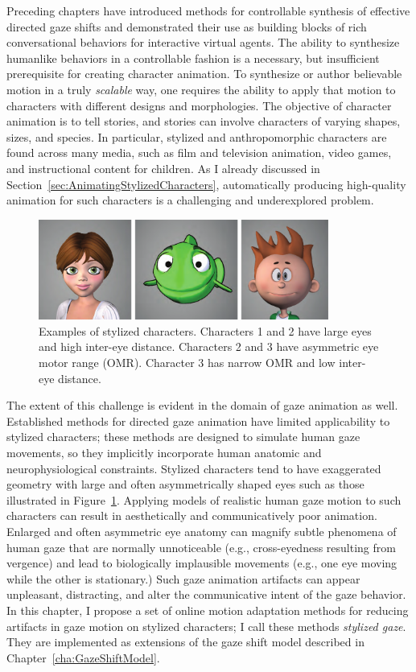Preceding chapters have introduced methods for controllable synthesis of effective directed gaze shifts and demonstrated their use as building blocks of rich conversational behaviors for interactive virtual agents. The ability to synthesize humanlike behaviors in a controllable fashion is a necessary, but insufficient prerequisite for creating character animation.
To synthesize or author believable motion in a truly \emph{scalable} way, one requires the ability to apply that motion to characters with different designs and morphologies. The objective of character animation is to tell stories, and stories can involve characters of varying shapes, sizes, and species. In particular, stylized and anthropomorphic characters are found across many media, such as film and television animation, video games, and instructional content for children. As I already discussed in Section~\ref{sec:AnimatingStylizedCharacters}, automatically producing high-quality animation for such characters is a challenging and underexplored problem.

\begin{figure}
\centering
\includegraphics[width=0.85\textwidth]{stylizedgaze/Figures/StylizedCharacterExamples-small.pdf}
\caption{Examples of stylized characters. Characters 1 and 2 have large eyes and high inter-eye distance. Characters 2 and 3 have asymmetric eye motor range (OMR). Character 3 has narrow OMR and low inter-eye distance.}
\label{fig:StylizedCharacterExamples}
\end{figure}

The extent of this challenge is evident in the domain of gaze animation as well. Established methods for directed gaze animation have limited applicability to stylized characters; these methods are designed to simulate human gaze movements, so they implicitly incorporate human anatomic and neurophysiological constraints. Stylized characters tend to have exaggerated geometry with large and often asymmetrically shaped eyes such as those illustrated in Figure~\ref{fig:StylizedCharacterExamples}. Applying models of realistic human gaze motion to such characters can result in aesthetically and communicatively poor animation. Enlarged and often asymmetric eye anatomy can magnify subtle phenomena of human gaze that are normally unnoticeable (e.g., cross-eyedness resulting from vergence) and lead to biologically implausible movements (e.g., one eye moving while the other is stationary.) Such gaze animation artifacts can appear unpleasant, distracting, and alter the communicative intent of the gaze behavior. In this chapter, I propose a set of online motion adaptation methods for reducing artifacts in gaze motion on stylized characters; I call these methods \emph{stylized gaze}. They are implemented as extensions of the gaze shift model described in Chapter~\ref{cha:GazeShiftModel}.

